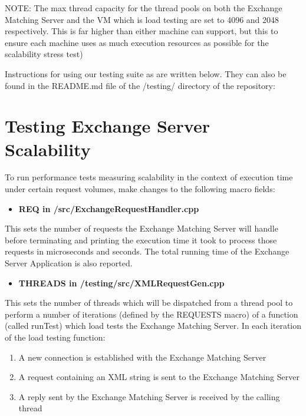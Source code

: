 \documentclass[letterpaper, 10 pt, conference]{ieeeconf}
\begin{document}
NOTE: The max thread capacity for the thread 
pools on both the Exchange Matching Server and 
the VM which is load testing are set to 4096 
and 2048 respectively. This is far higher than 
either machine can support, but this to ensure 
each machine uses as much execution resources 
as possible for the scalability stress test)



Instructions for using our testing suite as are written below. They can also be found in the 
README.md file of the /testing/ directory of 
the repository: 
  
\section{Testing Exchange Server Scalability}  



To run performance tests measuring scalability 
in the context of execution time under certain 
request volumes, make changes to the 
following macro fields:
\begin{itemize}
  \item \textbf{{REQ} in 
    /src/ExchangeRequestHandler.cpp}
\end{itemize}
   

   
   This sets the number of requests the
   Exchange Matching Server will handle before
   terminating and printing the execution time
   it took to process those requests in
   microseconds and seconds. The total running
   time of the Exchange Server Application is
   also reported.
     
\begin{itemize}
\item \textbf{THREADS in /testing/src/XMLRequestGen.cpp}
\end{itemize}

 This sets the number of threads which will be
 dispatched from a thread pool to perform a number of iterations (defined by the REQUESTS macro) of a function (called runTest) which load tests the Exchange Matching Server. In each iteration of the load testing function:
 
 
 
\begin{enumerate}
\item A new connection is established with the Exchange Matching Server
\item A request containing an XML string is sent to the Exchange Matching Server
\item A reply sent by the Exchange Matching Server is received by the calling thread
\end{enumerate}
\end{document}
